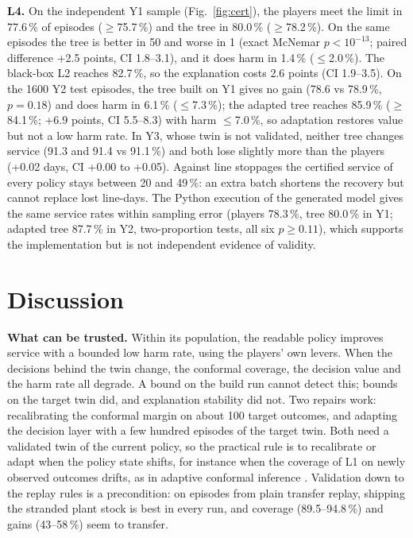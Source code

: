 \documentclass{ifacconf}
\begin{document}
\textbf{L4.} On the independent Y1 sample (Fig.~\ref{fig:cert}), the players meet the limit in 77.6\,\% of
episodes ($\ge$75.7\,\%) and the tree in 80.0\,\% ($\ge$78.2\,\%). On the same episodes the tree is better in 50
and worse in 1 (exact McNemar $p<10^{-13}$; paired difference +2.5 points, CI 1.8--3.1), and it does harm in
1.4\,\% ($\le$2.0\,\%). The black-box L2 reaches 82.7\,\%, so the explanation costs 2.6 points (CI 1.9--3.5). On
the \num{1600} Y2 test episodes, the tree built on Y1 gives no gain (78.6 vs 78.9\,\%, $p=0.18$) and does harm in
6.1\,\% ($\le$7.3\,\%); the adapted tree reaches 85.9\,\% ($\ge$84.1\,\%; +6.9 points, CI 5.5--8.3) with harm
$\le$7.0\,\%, so adaptation restores value but not a low harm rate. In Y3, whose twin is not validated, neither
tree changes service (91.3 and 91.4 vs 91.1\,\%) and both lose slightly more than the players (+0.02 days, CI
+0.00 to +0.05). Against line stoppages the certified service of every policy stays between 20 and 49\,\%: an extra batch
shortens the recovery but cannot replace lost line-days. The Python execution of the generated model gives the same service
rates within sampling error (players 78.3\,\%, tree 80.0\,\% in Y1; adapted tree 87.7\,\% in Y2, two-proportion
tests, all six $p \ge 0.11$), which supports the implementation but is not independent evidence of validity.

\section{Discussion}\label{sec:discussion}

\textbf{What can be trusted.} Within its population, the readable policy improves service with a bounded low
harm rate, using the players' own levers. When the decisions behind the twin change, the conformal coverage, the decision value and
the harm rate all degrade. A bound on the build run cannot detect this; bounds on the target twin did, and
explanation stability did not. Two repairs work: recalibrating the conformal margin on about 100 target outcomes,
and adapting the decision layer with a few hundred episodes of the target twin. Both need a validated twin of the
current policy, so the practical rule is to recalibrate or adapt when the policy state shifts, for instance when
the coverage of L1 on newly observed outcomes drifts, as in adaptive conformal inference \citep{gibbs2021aci}.
Validation down to the replay rules is a precondition: on episodes from plain transfer replay, shipping the
stranded plant stock is best in every run, and coverage (89.5--94.8\,\%) and gains (43--58\,\%) seem to transfer.
\end{document}
